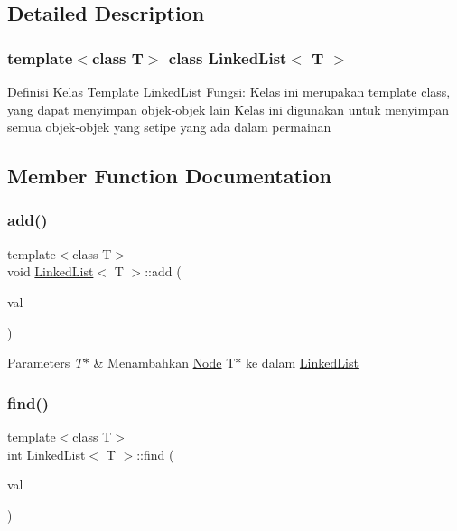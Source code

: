 \subsection{Detailed Description}
\subsubsection*{template$<$class T$>$\newline
class Linked\+List$<$ T $>$}

Definisi Kelas Template \mbox{\hyperlink{class_linked_list}{Linked\+List}} Fungsi\+: Kelas ini merupakan template class, yang dapat menyimpan objek-\/objek lain Kelas ini digunakan untuk menyimpan semua objek-\/objek yang setipe yang ada dalam permainan 

\subsection{Member Function Documentation}
\mbox{\label{class_linked_list_acf312b61f5d68eac9d4a08c70dbb7276}} 
\subsubsection{\texorpdfstring{add()}{add()}}
{\footnotesize\ttfamily template$<$class T$>$ \\
void \mbox{\hyperlink{class_linked_list}{Linked\+List}}$<$ T $>$\+::add (\begin{DoxyParamCaption}\item[{T $\ast$}]{val }\end{DoxyParamCaption})\hspace{0.3cm}{\ttfamily [inline]}}


\begin{DoxyParams}{Parameters}
{\em T$\ast$} & Menambahkan \mbox{\hyperlink{class_node}{Node}} T$\ast$ ke dalam \mbox{\hyperlink{class_linked_list}{Linked\+List}} \\
\hline
\end{DoxyParams}
\mbox{\label{class_linked_list_a881eb35646625db85ea669cf80681f8f}} 
\subsubsection{\texorpdfstring{find()}{find()}}
{\footnotesize\ttfamily template$<$class T$>$ \\
int \mbox{\hyperlink{class_linked_list}{Linked\+List}}$<$ T $>$\+::find (\begin{DoxyParamCaption}\item[{T \&}]{val }\end{DoxyParamCaption})\hspace{0.3cm}{\ttfamily [inline]}}


